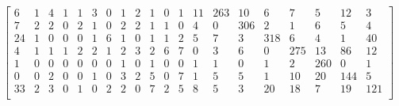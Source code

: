 \documentclass[a4paper, 11pt]{article}
\begin{document}
\[\begin{bmatrix}
     6  &   1  &   4  &   1  &   1  &   3  &   0  &   1  &   2  &   1  &   0  &   1  &  11  & 263  &  10  &   6  &   7  &   5  &  12    &  3 \\
     7  &   2  &   2  &   0  &   2  &   1  &   0  &   2  &   2  &   1  &   1  &   0  &   4  &   0  & 306  &   2  &   1  &   6  &   5    &  4 \\
    24  &   1  &   0  &   0  &   0  &   1  &   6  &   1  &   0  &   1  &   1  &   2  &   5  &   7  &   3  & 318  &   6  &   4  &   1    & 40 \\
     4  &   1  &   1  &   1  &   2  &   2  &   1  &   2  &   3  &   2  &   6  &   7  &   0  &   3  &   6  &   0  & 275  &  13  &  86    & 12 \\
     1  &   0  &   0  &   0  &   0  &   0  &   0  &   1  &   0  &   1  &   0  &   0  &   1  &   1  &   0  &   1  &   2  & 260  &   0    &  1 \\
     0  &   0  &   2  &   0  &   0  &   1  &   0  &   3  &   2  &   5  &   0  &   7  &   1  &   5  &   5  &   1  &  10  &  20  & 144    &  5 \\
    33  &   2  &   3  &   0  &   1  &   0  &   2  &   2  &   0  &   7  &   2  &   5  &   8  &   5  &   3  &  20  &  18  &   7  &  19  &  121 \\
\end{bmatrix}\]
\end{document}
